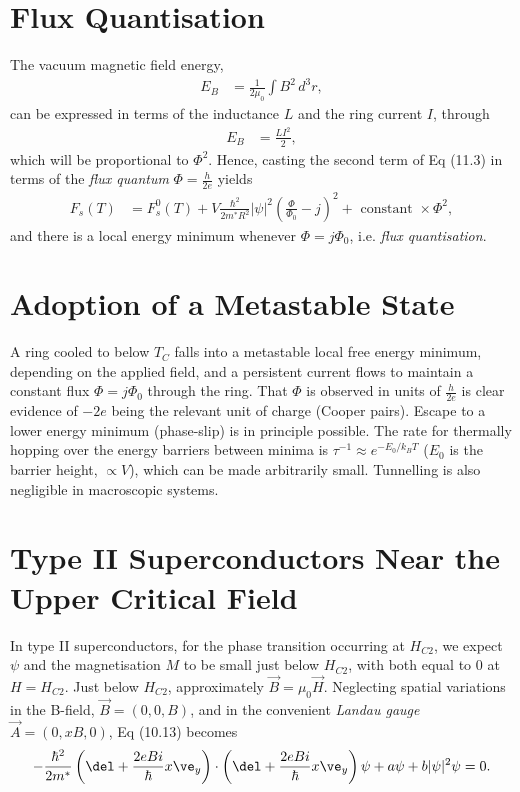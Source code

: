 \documentclass[a4paper, 11pt, normalem]{report}
\begin{document}
\section{Flux Quantisation}
The vacuum magnetic field energy,
\begin{align}
    E_B &= \frac{1}{2\mu_0}\int B^2\,d^3r,
\end{align}
can be expressed in terms of the inductance $L$ and the ring current $I$, through
\begin{align}
    E_B &= \frac{LI^2}{2},
\end{align}
which will be proportional to $\Phi^2$.
Hence, casting the second term of Eq (11.3) in terms of the \emph{flux quantum} $\Phi=\frac{h}{2e}$ yields
\begin{align}
    F_s(T) &= F_s^0(T) + V\frac{\hbar^2}{2m^*R^2}|\psi|^2\left(\frac{\Phi}{\Phi_0}-j\right)^2 + \text{ constant } \times\Phi^2,
\end{align}
and there is a local energy minimum whenever $\Phi=j\Phi_0$, i.e. \emph{flux quantisation}.

\section{Adoption of a Metastable State}
A ring cooled to below $T_C$ falls into a metastable local free energy minimum, depending on the applied field, and a persistent current flows to maintain a constant flux $\Phi=j\Phi_0$ through the ring.
That $\Phi$ is observed in units of $\frac{h}{2e}$ is clear evidence of $-2e$ being the relevant unit of charge (Cooper pairs).
Escape to a lower energy minimum (phase-slip) is in principle possible.
The rate for thermally hopping over the energy barriers between minima is $\tau^{-1}\approx e^{-E_0/k_BT}$ ($E_0$ is the barrier height, $\propto V$), which can be made arbitrarily small.
Tunnelling is also negligible in macroscopic systems.

\section{Type II Superconductors Near the Upper Critical Field}
In type II superconductors, for the phase transition occurring at $H_{C2}$, we expect $\psi$ and the magnetisation $M$ to be small just below $H_{C2}$, with both equal to 0 at $H=H_{C2}$.
Just below $H_{C2}$, approximately $\vec{B}=\mu_0\vec{H}$.
Neglecting spatial variations in the B-field, $\vec{B}=(0,0,B)$, and in the convenient \emph{Landau gauge} $\vec{A}=(0,xB,0)$, Eq (10.13) becomes
\begin{align}
    -\frac{\hbar^2}{2m^*}\left(\del+\frac{2eBi}{\hbar}x\ve_y\right)\cdot\left(\del+\frac{2eBi}{\hbar}x\ve_y\right)\psi + a\psi + b|\psi|^2\psi = 0.
\end{align}
\end{document}
